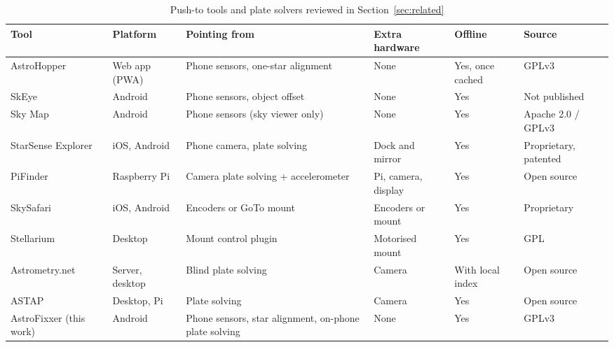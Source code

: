 \begin{table}[t]
\centering
\caption{Push-to tools and plate solvers reviewed in Section~\ref{sec:related}}
\label{tab:compare}
\small
\setlength{\tabcolsep}{4pt}
\begin{tabularx}{\textwidth}{@{}l l X l l l@{}}
\toprule
Tool & Platform & Pointing from & Extra hardware & Offline & Source \\
\midrule
AstroHopper~\cite{astrohopper} & Web app (PWA) & Phone sensors, one-star alignment & None & Yes, once cached & GPLv3 \\
SkEye~\cite{skeye} & Android & Phone sensors, object offset & None & Yes & Not published \\
Sky Map~\cite{skymap} & Android & Phone sensors (sky viewer only) & None & Yes & Apache 2.0 / GPLv3 \\
StarSense Explorer~\cite{starsense} & iOS, Android & Phone camera, plate solving & Dock and mirror & Yes & Proprietary, patented \\
PiFinder~\cite{pifinder} & Raspberry Pi & Camera plate solving + accelerometer & Pi, camera, display & Yes & Open source \\
SkySafari~\cite{skysafari} & iOS, Android & Encoders or GoTo mount & Encoders or mount & Yes & Proprietary \\
Stellarium~\cite{zotti2021} & Desktop & Mount control plugin & Motorised mount & Yes & GPL \\
Astrometry.net~\cite{lang2010} & Server, desktop & Blind plate solving & Camera & With local index & Open source \\
ASTAP~\cite{astap} & Desktop, Pi & Plate solving & Camera & Yes & Open source \\
\midrule
AstroFixxer (this work) & Android & Phone sensors, star alignment, on-phone plate solving & None & Yes & GPLv3 \\
\bottomrule
\end{tabularx}
\end{table}

